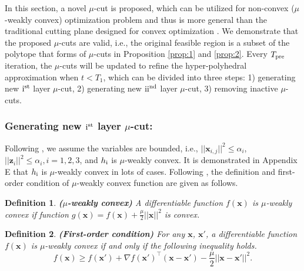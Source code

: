 \documentclass[letterpaper]{article} %
\newtheorem{definition}{Definition}
\begin{document}
In this section, a novel $\mu$-cut is proposed, which can be utilized for non-convex ($\mu$-weakly convex) optimization problem and thus is more general than the traditional cutting plane designed for convex optimization  \cite{jiao2022asynchronous,franc2011cutting}. We demonstrate that the proposed $\mu$-cuts are valid, i.e., the original feasible region is a subset of the polytope that forms of $\mu$-cuts in Proposition \ref{prop:1} and \ref{prop:2}.  Every $T_{\rm{pre}}$ iteration, the $\mu$-cuts will be updated to refine the hyper-polyhedral approximation when $t<T_1$, which can be divided into three steps: 1) generating new ${\rm{\uppercase\expandafter{\romannumeral1}}}^{\rm{st}}$ layer $\mu$-cut, 2) generating new ${\rm{\uppercase\expandafter{\romannumeral2}}}^{\rm{nd}}$ layer $\mu$-cut, 3) removing inactive $\mu$-cuts.

\subsubsection{Generating new ${\rm{\uppercase\expandafter{\romannumeral1}}}^{\rm{st}}$ layer $\mu$-cut:}

Following \cite{qian2019robust}, we assume the variables are bounded, i.e., $||\boldsymbol{x}_{i,j}||^2\!\le\!\alpha_i$, $||\boldsymbol{z}_i||^2\!\le\!\alpha_i,i\!=\!1,2,3$, and $h_{\rm{\uppercase\expandafter{\romannumeral1}}}$ is $\mu$-weakly convex. It is demonstrated in Appendix E that  $h_{\rm{\uppercase\expandafter{\romannumeral1}}}$ is $\mu$-weakly convex in lots of cases. Following \cite{xie2019asynchronous,davis2019stochastic}, the definition and first-order condition of $\mu$-weakly convex function are given as follows.


\begin{definition}
\textbf{($\mu$-weakly convex)} A differentiable function $f(\boldsymbol{x})$ is $\mu$-weakly convex if function $g(\boldsymbol{x})=f(\boldsymbol{x})+\frac{\mu}{2}||\boldsymbol{x}||^2$ is convex. %
\end{definition}


\begin{definition}
\label{def:2}
\textbf{(First-order condition)} For any $\boldsymbol{x}$, $\boldsymbol{x}'$, a differentiable function $f(\boldsymbol{x})$ is $\mu$-weakly convex if and only if the following inequality holds.
\begin{equation}
f(\boldsymbol{x})\ge f(\boldsymbol{x}') + \nabla f(\boldsymbol{x}')^{\top}(\boldsymbol{x}-\boldsymbol{x}') - \frac{\mu}{2} ||\boldsymbol{x}-\boldsymbol{x}'||^2.
\end{equation}
\end{definition}
\end{document}
